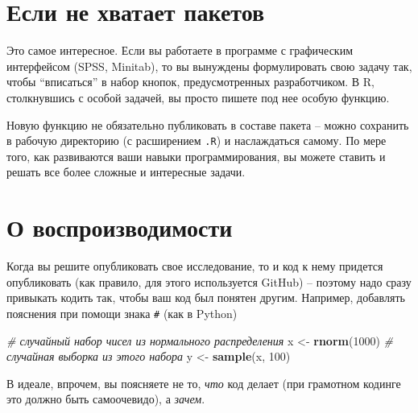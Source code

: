 \documentclass[
]{book}
\newenvironment{Shaded}{\begin{snugshade}}{\end{snugshade}}
\newcommand{\CommentTok}[1]{\textcolor[rgb]{0.56,0.35,0.01}{\textit{#1}}}
\newcommand{\DecValTok}[1]{\textcolor[rgb]{0.00,0.00,0.81}{#1}}
\newcommand{\FunctionTok}[1]{\textcolor[rgb]{0.13,0.29,0.53}{\textbf{#1}}}
\newcommand{\NormalTok}[1]{#1}
\newcommand{\OtherTok}[1]{\textcolor[rgb]{0.56,0.35,0.01}{#1}}
\theoremstyle{definition}
\theoremstyle{definition}
\theoremstyle{definition}
\theoremstyle{definition}
\theoremstyle{remark}
\begin{document}
\hypertarget{ux435ux441ux43bux438-ux43dux435-ux445ux432ux430ux442ux430ux435ux442-ux43fux430ux43aux435ux442ux43eux432}{%
\section{Если не хватает пакетов}\label{ux435ux441ux43bux438-ux43dux435-ux445ux432ux430ux442ux430ux435ux442-ux43fux430ux43aux435ux442ux43eux432}}

Это самое интересное. Если вы работаете в программе с графическим интерфейсом (SPSS, Minitab), то вы вынуждены формулировать свою задачу так, чтобы ``вписаться'' в набор кнопок, предусмотренных разработчиком. В R, столкнувшись с особой задачей, вы просто пишете под нее особую функцию.

Новую функцию не обязательно публиковать в составе пакета -- можно сохранить в рабочую директорию (с расширением \texttt{.R}) и наслаждаться самому. По мере того, как развиваются ваши навыки программирования, вы можете ставить и решать все более сложные и интересные задачи.

\hypertarget{ux43e-ux432ux43eux441ux43fux440ux43eux438ux437ux432ux43eux434ux438ux43cux43eux441ux442ux438}{%
\section{О воспроизводимости}\label{ux43e-ux432ux43eux441ux43fux440ux43eux438ux437ux432ux43eux434ux438ux43cux43eux441ux442ux438}}

Когда вы решите опубликовать свое исследование, то и код к нему придется опубликовать (как правило, для этого используется GitHub) -- поэтому надо сразу привыкать кодить так, чтобы ваш код был понятен другим. Например, добавлять пояснения при помощи знака \texttt{\#} (как в Python)

\begin{Shaded}
\begin{Highlighting}[]
\CommentTok{\# случайный набор чисел из нормального распределения}
\NormalTok{x }\OtherTok{\textless{}{-}} \FunctionTok{rnorm}\NormalTok{(}\DecValTok{1000}\NormalTok{)}
\CommentTok{\# случайная выборка из этого набора}
\NormalTok{y }\OtherTok{\textless{}{-}} \FunctionTok{sample}\NormalTok{(x, }\DecValTok{100}\NormalTok{)}
\end{Highlighting}
\end{Shaded}

В идеале, впрочем, вы поясняете не то, \emph{что} код делает (при грамотном кодинге это должно быть самоочевидо), а \emph{зачем}.
\end{document}
